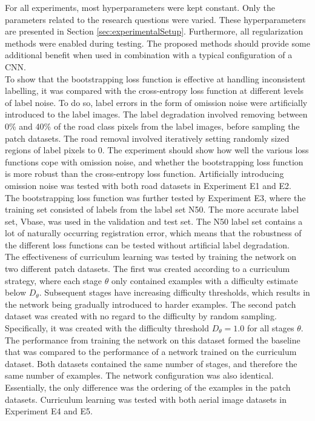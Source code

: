 For all experiments, most hyperparameters were kept constant. Only the parameters related to the research questions were varied. These hyperparameters are presented in Section \ref{sec:experimentalSetup}. Furthermore, all regularization methods were enabled during testing. The proposed methods should provide some additional benefit when used in combination with a typical configuration of a \ac{CNN}.\\

To show that the bootstrapping loss function is effective at handling inconsistent labelling, it was compared with the cross-entropy loss function at different levels of label noise. To do so, label errors in the form of omission noise were artificially introduced to the label images. The label degradation involved removing between 0\% and 40\% of the road class pixels from the label images, before sampling the patch datasets. The road removal involved iteratively setting randomly sized regions of label pixels to 0. The experiment should show how well the various loss functions cope with omission noise, and whether the bootstrapping loss function is more robust than the cross-entropy loss function. Artificially introducing omission noise was tested with both road datasets in Experiment E1 and E2.\\

The bootstrapping loss function was further tested by Experiment E3, where the training set consisted of labels from the label set N50. The more accurate label set, Vbase, was used in the validation and test set. The N50 label set contains a lot of naturally occurring registration error, which means that the robustness of the different loss functions can be tested without artificial label degradation.\\

The effectiveness of curriculum learning was tested by training the network on two different patch datasets. The first was created according to a curriculum strategy, where each stage $\theta$ only contained examples with a difficulty estimate below $D_\theta$. Subsequent stages have increasing difficulty thresholds, which results in the network being gradually introduced to harder examples. The second patch dataset was created with no regard to the difficulty by random sampling. Specifically, it was created with the difficulty threshold $D_\theta =1.0$ for  all stages $\theta$. The performance from training the network on this dataset formed the baseline that was compared to the performance of a network trained on the curriculum dataset. Both datasets contained the same number of stages, and therefore the same number of examples. The network configuration was also identical. Essentially, the only difference was the ordering of the examples in the patch datasets. Curriculum learning was tested with both aerial image datasets in Experiment E4 and E5.\\

